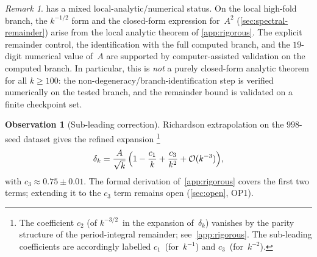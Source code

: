 \documentclass[11pt,a4paper]{article}
\theoremstyle{plain}
\theoremstyle{definition}
\newtheorem{observation}[theorem]{Observation}
\theoremstyle{remark}
\newtheorem{remark}[theorem]{Remark}
\newcommand{\Oo}{\mathcal{O}}
\begin{document}
\begin{remark}
   has a mixed local-analytic/numerical status.
  On the local high-fold branch, the $k^{-1/2}$ form and the
  closed-form expression for~$A^2$ (\cref{sec:spectral-remainder})
  arise from the local analytic theorem of \cref{app:rigorous}.
  The explicit remainder control, the identification with the full
  computed branch, and the $19$-digit numerical value of~$A$ are
  supported by computer-assisted validation on the computed branch.
  In particular, this is \emph{not} a purely closed-form analytic
  theorem for all $k \ge 100$: the non-degeneracy/branch-identification
  step is verified numerically on the tested branch, and the remainder
  bound is validated on a finite checkpoint set.
\end{remark}

\begin{observation}[Sub-leading correction]\label{obs:c3}
  Richardson extrapolation on the $998$-seed dataset gives
  the refined expansion%
  \footnote{The coefficient $c_2$ (of $k^{-3/2}$~in the expansion
    of~$\delta_k$) vanishes by the parity structure of the
    period-integral remainder; see~\cref{app:rigorous}.
    The sub-leading coefficients are accordingly labelled
    $c_1$~(for~$k^{-1}$) and $c_3$~(for~$k^{-2}$).}
  \begin{equation}
    \delta_k = \frac{A}{\sqrt{k}}\,
      \Bigl(1 - \frac{c_1}{k} + \frac{c_3}{k^2}
      + \Oo(k^{-3})\Bigr),
    \label{eq:asymptotic-refined}
  \end{equation}
  with $c_3 \approx 0.75 \pm 0.01$.
  The formal derivation of~\cref{app:rigorous} covers
  the first two terms; extending it to the $c_3$ term
  remains open (\cref{sec:open}, OP1).
\end{observation}
\end{document}
